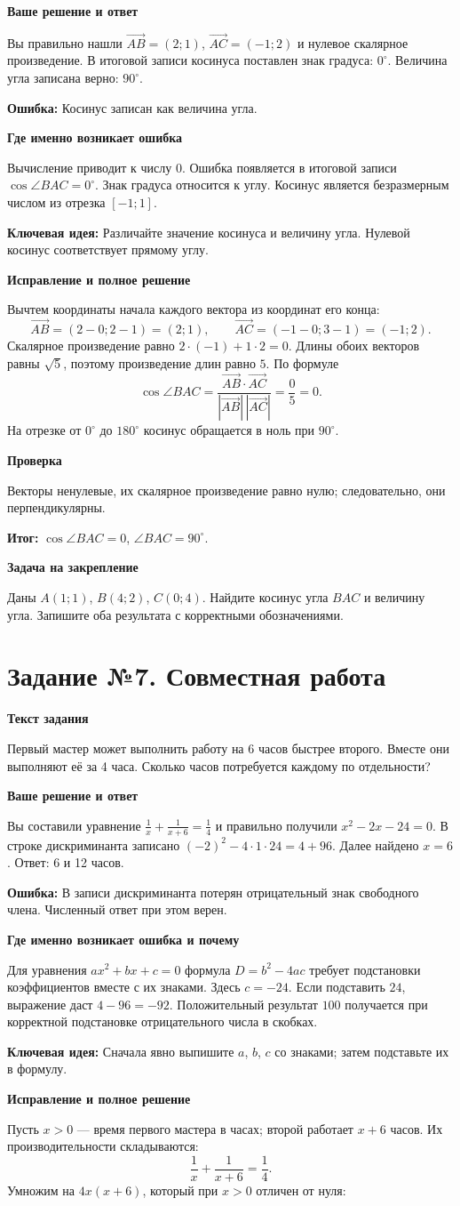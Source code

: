\documentclass[a4paper,12pt]{article}
\newcommand{\parthead}[1]{\par\smallskip\textbf{#1}\par\nopagebreak[4]}
\newcommand{\err}[1]{\par\textcolor{red!75!black}{\textbf{Ошибка:}} #1\par}
\newcommand{\idea}[1]{\par\textcolor{blue!60!black}{\textbf{Ключевая идея:}} #1\par}
\newcommand{\result}[1]{\par\textcolor{accent}{\textbf{Итог:}} #1\par}
\newcommand{\task}[2]{\clearpage\phantomsection\label{task:#1}\section*{\textcolor{accent}{Задание №#1. #2}}}
\begin{document}
\parthead{Ваше решение и ответ}
Вы правильно нашли $\overrightarrow{AB}=(2;1)$, $\overrightarrow{AC}=(-1;2)$ и нулевое скалярное произведение. В итоговой записи косинуса поставлен знак градуса: $0^\circ$. Величина угла записана верно: $90^\circ$.
\err{Косинус записан как величина угла.}
\parthead{Где именно возникает ошибка}
Вычисление приводит к числу $0$. Ошибка появляется в итоговой записи $\cos\angle BAC=0^\circ$. Знак градуса относится к углу. Косинус является безразмерным числом из отрезка $[-1;1]$.
\idea{Различайте значение косинуса и величину угла. Нулевой косинус соответствует прямому углу.}
\parthead{Исправление и полное решение}
Вычтем координаты начала каждого вектора из координат его конца:
\[\overrightarrow{AB}=(2-0;2-1)=(2;1),\qquad
\overrightarrow{AC}=(-1-0;3-1)=(-1;2).\]
Скалярное произведение равно $2\cdot(-1)+1\cdot2=0$. Длины обоих векторов равны $\sqrt5$, поэтому произведение длин равно $5$. По формуле
\[\cos\angle BAC=\frac{\overrightarrow{AB}\cdot\overrightarrow{AC}}{|\overrightarrow{AB}|\,|\overrightarrow{AC}|}=\frac{0}{5}=0.\]
На отрезке от $0^\circ$ до $180^\circ$ косинус обращается в ноль при $90^\circ$.
\parthead{Проверка}
Векторы ненулевые, их скалярное произведение равно нулю; следовательно, они перпендикулярны.
\result{$\cos\angle BAC=0$, $\angle BAC=90^\circ$.}
\parthead{Задача на закрепление}
Даны $A(1;1)$, $B(4;2)$, $C(0;4)$. Найдите косинус угла $BAC$ и величину угла. Запишите оба результата с корректными обозначениями.
\task{7}{Совместная работа}
\parthead{Текст задания}
Первый мастер может выполнить работу на 6 часов быстрее второго. Вместе они выполняют её за 4 часа. Сколько часов потребуется каждому по отдельности?
\parthead{Ваше решение и ответ}
Вы составили уравнение $\frac1x+\frac1{x+6}=\frac14$ и правильно получили $x^2-2x-24=0$. В строке дискриминанта записано $(-2)^2-4\cdot1\cdot24=4+96$. Далее найдено $x=6$. Ответ: 6 и 12 часов.
\err{В записи дискриминанта потерян отрицательный знак свободного члена. Численный ответ при этом верен.}
\parthead{Где именно возникает ошибка и почему}
Для уравнения $ax^2+bx+c=0$ формула $D=b^2-4ac$ требует подстановки коэффициентов вместе с их знаками. Здесь $c=-24$. Если подставить $24$, выражение даст $4-96=-92$. Положительный результат $100$ получается при корректной подстановке отрицательного числа в скобках.
\idea{Сначала явно выпишите $a$, $b$, $c$ со знаками; затем подставьте их в формулу.}
\parthead{Исправление и полное решение}
Пусть $x>0$ --- время первого мастера в часах; второй работает $x+6$ часов. Их производительности складываются:
\[\frac1x+\frac1{x+6}=\frac14.\]
Умножим на $4x(x+6)$, который при $x>0$ отличен от нуля:
\end{document}
